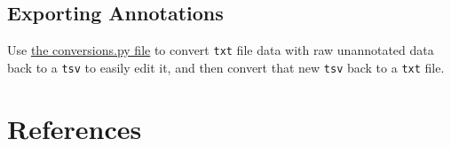 \documentclass[11pt]{article}
\begin{document}
\subsection{Exporting Annotations}

Use \href{https://github.com/willtholke/annotation-project/blob/main/data-collection/conversions.py}{the conversions.py file} to convert \texttt{txt} file data with raw unannotated data back to a \texttt{tsv} to  easily edit it, and then convert that new \texttt{tsv} back to a \texttt{txt} file. 

\newpage

\section{References}


\begin{raggedright}




\end{raggedright}
\end{document}
